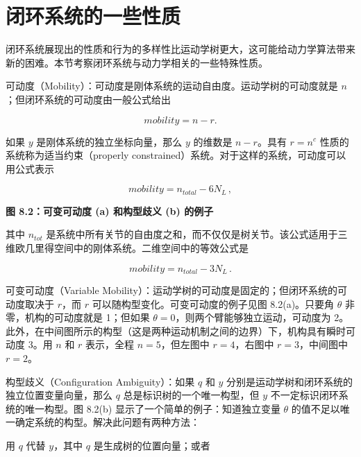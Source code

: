 \documentclass[10pt,a4paper]{book}
\theoremstyle{thmstyle} %
\theoremstyle{defstyle} %
\theoremstyle{prostyle} %
\begin{document}
\section{闭环系统的一些性质}





闭环系统展现出的性质和行为的多样性比运动学树更大，这可能给动力学算法带来新的困难。本节考察闭环系统与动力学相关的一些特殊性质。



可动度（Mobility）：可动度是刚体系统的运动自由度。运动学树的可动度就是 $n$；但闭环系统的可动度由一般公式给出



$$
mobility = n - r .
$$



如果 $y$ 是刚体系统的独立坐标向量，那么 $y$ 的维数是 $n - r$。具有 $r = n^c$ 性质的系统称为适当约束（properly constrained）系统。对于这样的系统，可动度可以用公式表示



$$
mobility = n _ { total } - 6 N _ { L } \, ,
$$



\noindent\textbf{图 8.2：可变可动度 (a) 和构型歧义 (b) 的例子}





其中 $n_{tot}$ 是系统中所有关节的自由度之和，而不仅仅是树关节。该公式适用于三维欧几里得空间中的刚体系统。二维空间中的等效公式是



$$
mobility = n _ { total } - 3 N _ { L } \, .
$$



可变可动度（Variable Mobility）：运动学树的可动度是固定的；但闭环系统的可动度取决于 $r$，而 $r$ 可以随构型变化。可变可动度的例子见图 8.2(a)。只要角 $\theta$ 非零，机构的可动度就是 1；但如果 $\theta = 0$，则两个臂能够独立运动，可动度为 2。此外，在中间图所示的构型（这是两种运动机制之间的边界）下，机构具有瞬时可动度 3。用 $n$ 和 $r$ 表示，全程 $n = 5$，但左图中 $r = 4$，右图中 $r = 3$，中间图中 $r = 2$。



构型歧义（Configuration Ambiguity）：如果 $q$ 和 $y$ 分别是运动学树和闭环系统的独立位置变量向量，那么 $q$ 总是标识树的一个唯一构型，但 $y$ 不一定标识闭环系统的唯一构型。图 8.2(b) 显示了一个简单的例子：知道独立变量 $\theta$ 的值不足以唯一确定系统的构型。解决此问题有两种方法：



用 $q$ 代替 $y$，其中 $q$ 是生成树的位置向量；或者
\end{document}
